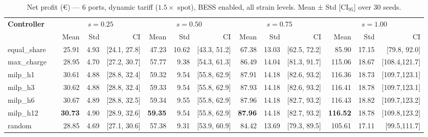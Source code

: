 \begin{table}[!htb]
\centering
\caption{Net profit (€) — 6 ports, dynamic tariff ($1.5\times$ spot), BESS enabled,
         all strain levels. Mean ± Std [CI$_{95}$] over 30 seeds.}
\label{tab:gc_6port_dynamic}
\setlength{\tabcolsep}{3pt}
\begin{tabular}{lp{1cm} rrr rrr rrr rrr}
\toprule
\textbf{Controller} & &
  \multicolumn{3}{c}{$s=0.25$} &
  \multicolumn{3}{c}{$s=0.50$} &
  \multicolumn{3}{c}{$s=0.75$} &
  \multicolumn{3}{c}{$s=1.00$} \\
\cmidrule(lr){3-5}\cmidrule(lr){6-8}\cmidrule(lr){9-11}\cmidrule(lr){12-14}
 & & Mean & Std & CI & Mean & Std & CI & Mean & Std & CI & Mean & Std & CI \\
\midrule
equal\_share & &  25.91 &  4.93 & [24.1, 27.8] &  47.23 & 10.62 & [43.3, 51.2] &  67.38 & 13.03 & [62.5, 72.2] &  85.90 & 17.15 & [79.8, 92.0] \\
max\_charge  & &  28.95 &  4.70 & [27.2, 30.7] &  57.77 &  9.38 & [54.3, 61.3] &  86.49 & 14.04 & [81.3, 91.7] & 115.06 & 18.67 & [108.4,121.7] \\
milp\_h1     & &  30.61 &  4.88 & [28.8, 32.4] &  59.32 &  9.54 & [55.8, 62.9] &  87.91 & 14.18 & [82.6, 93.2] & 116.36 & 18.73 & [109.7,123.1] \\
milp\_h3     & &  30.62 &  4.88 & [28.8, 32.4] &  59.33 &  9.54 & [55.8, 62.9] &  87.93 & 14.18 & [82.6, 93.2] & 116.41 & 18.78 & [109.7,123.1] \\
milp\_h6     & &  30.67 &  4.89 & [28.8, 32.5] &  59.34 &  9.55 & [55.8, 62.9] &  87.96 & 14.18 & [82.7, 93.2] & 116.43 & 18.82 & [109.7,123.2] \\
milp\_h12    & & \textbf{30.73} &  4.90 & [28.9, 32.6] & \textbf{59.35} &  9.54 & [55.8, 62.9] & \textbf{87.96} & 14.18 & [82.7, 93.2] & \textbf{116.52} & 18.78 & [109.8,123.2] \\
random       & &  28.85 &  4.69 & [27.1, 30.6] &  57.38 &  9.31 & [53.9, 60.9] &  84.42 & 13.69 & [79.3, 89.5] & 105.61 & 17.11 & [99.5,111.7] \\
\bottomrule
\end{tabular}
\end{table}

